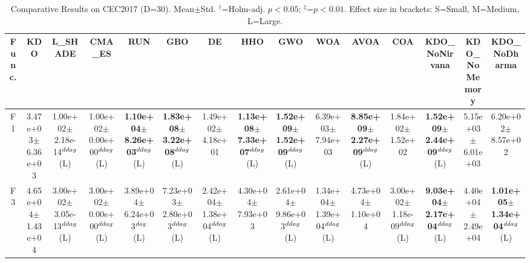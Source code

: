 \begin{table}[!t]
\centering\small
\caption{Comparative Results on CEC2017 (D=30). Mean$\pm$Std. $^{\dag}$=Holm-adj. $p<0.05$; $^{\ddag}$=$p<0.01$. Effect size in brackets: S=Small, M=Medium, L=Large.}
\label{tab:enhanced}
\begin{tabular}{c|cccccccccccccc}
\hline
Func. & \textbf{KDO} & L_SHADE & CMA_ES & RUN & GBO & DE & HHO & GWO & WOA & AVOA & COA & KDO_NoNirvana & KDO_NoMemory & KDO_NoDharma \\ \hline\hline
F1  & 3.47e+03$\pm$6.36e+03  & 1.00e+02$\pm$2.18e-14$^{\\ddag}$ (L)  & 1.00e+02$\pm$0.00e+00$^{\\ddag}$ (L)  & \textbf{1.10e+04$\pm$8.26e+03}$^{\\ddag}$ (L)  & \textbf{1.83e+08$\pm$3.22e+08}$^{\\ddag}$ (L)  & 1.49e+02$\pm$4.18e+01   & \textbf{1.13e+08$\pm$7.33e+07}$^{\\ddag}$ (L)  & \textbf{1.52e+09$\pm$1.52e+09}$^{\\ddag}$ (L)  & 6.39e+03$\pm$7.94e+03   & \textbf{8.85e+09$\pm$2.27e+09}$^{\\ddag}$ (L)  & 1.84e+02$\pm$1.52e+02   & \textbf{1.52e+09$\pm$2.44e+09}$^{\\ddag}$ (L)  & 5.15e+03$\pm$6.01e+03   & 6.20e+02$\pm$8.57e+02  \\ \hline
F3  & 4.65e+04$\pm$1.43e+04  & 3.00e+02$\pm$3.05e-13$^{\\ddag}$ (L)  & 3.00e+02$\pm$0.00e+00$^{\\ddag}$ (L)  & 3.89e+04$\pm$6.24e+03$^{\\dag}$ (L)  & 7.23e+03$\pm$2.80e+03$^{\\ddag}$ (L)  & 2.42e+04$\pm$1.38e+04$^{\\ddag}$ (L)  & 4.30e+04$\pm$7.93e+03   & 2.61e+04$\pm$9.86e+03$^{\\ddag}$ (L)  & 1.34e+04$\pm$1.39e+04$^{\\ddag}$ (L)  & 4.73e+04$\pm$1.10e+04   & 3.00e+02$\pm$1.18e-09$^{\\ddag}$ (L)  & \textbf{9.03e+04$\pm$2.17e+04}$^{\\ddag}$ (L)  & 4.40e+04$\pm$2.49e+04   & \textbf{1.01e+05$\pm$1.34e+04}$^{\\ddag}$ (L) \\ \hline

\end{tabular}
\end{table}
